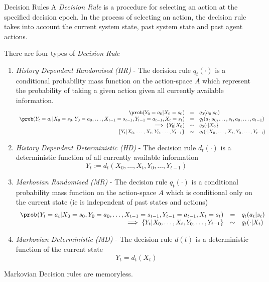 \documentclass[11pt,a4paper]{article}
\begin{document}
  \begin{definition}{Decision Rules}
    A \textit{Decision Rule} is a procedure for selecting an action at the specified decision epoch. In the process of selecting an action, the decision  rule takes into account the current system state, past system state and past agent actions.
    \par There are four types of \textit{Decision Rule}
    \begin{enumerate}
      \item \textit{History Dependent Randomised (HR)} - The decision rule $q_t(\cdot)$ is a conditional probability mass function on the action-space $A$ which represent the probability of taking a given action given all currently available information.
      \[\begin{array}{rcl}
        \prob(Y_0=a_0|X_0=s_0)&=&q_0(a_0|s_0)\\
        \prob(Y_t=a_t|X_0=s_0,Y_0=a_0,\dots,X_{t-1}=s_{t-1},Y_{t-1}=a_{t-1},X_t=s_t)&=&q_t(a_t|s_0,\dots,s_t,a_0,\dots,a_{t-1})\\
        \implies \{Y_0|X_0)&\sim&q_0(\cdot|X_0\}\\
        \{Y_t|X_0,\dots,X_t,Y_0,\dots,Y_{t-1}\}&\sim&q_t(\cdot|X_0,\dots,X_t,Y_0,\dots,Y_{t-1})
      \end{array}\]
      \item \textit{History Dependent Deterministic (HD)} - The decision rule $d_t(\cdot)$ is a deterministic function of all currently available information
      \[ Y_t:=d_t(X_0,\dots,X_t,Y_0,\dots,Y_{t-1}) \]
      \item \textit{Markovian Randomised (MR)} - The decision rule $q_t(\cdot)$ is a conditional probability mass function on the action-space $A$ which is conditional only on the current state (ie is independent of past states and actions)
      \[\begin{array}{rcl}
        \prob(Y_t=a_t|X_0=s_0,Y_0=a_0,\dots,X_{t-1}=s_{t-1},Y_{t-1}=a_{t-1},X_t=s_t)&=&q_t(a_t|s_t)\\
        \implies \{Y_t|X_0,\dots,X_t,Y_0,\dots,Y_{t-1}\}&\sim&q_t(\cdot|X_t)
      \end{array}\]
      \item \textit{Markovian Deterministic (MD)} - The decision rule $d(t)$ is a deterministic function of the current state
      \[ Y_t=d_t(X_t) \]
    \end{enumerate}
  \end{definition}

  \begin{remark}{Markovian Decision rules are memoryless.}\end{remark}
\end{document}
